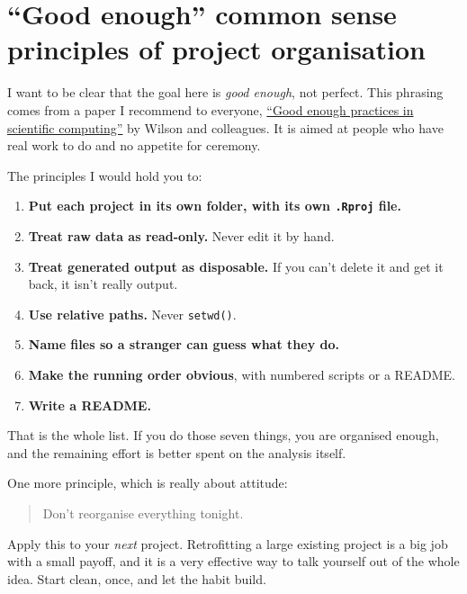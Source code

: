 \documentclass[
  letterpaper,
  justified,
  a4paper]{tufte-book}
\providecommand{\tightlist}{%
  \setlength{\itemsep}{0pt}\setlength{\parskip}{0pt}}
\providecommand{\tightlist}{%
  \setlength{\itemsep}{0pt}\setlength{\parskip}{0pt}}
\begin{document}
\section{``Good enough'' common sense principles of project
organisation}\label{good-enough-common-sense-principles-of-project-organisation}

I want to be clear that the goal here is \emph{good enough}, not
perfect. This phrasing comes from a paper I recommend to everyone,
\href{https://journals.plos.org/ploscompbiol/article?id=10.1371/journal.pcbi.1005510}{``Good
enough practices in scientific computing''} by Wilson and colleagues. It
is aimed at people who have real work to do and no appetite for
ceremony.

The principles I would hold you to:

\begin{enumerate}
\def\labelenumi{\arabic{enumi}.}
\tightlist
\item
  \textbf{Put each project in its own folder, with its own
  \texttt{.Rproj} file.}
\item
  \textbf{Treat raw data as read-only.} Never edit it by hand.
\item
  \textbf{Treat generated output as disposable.} If you can't delete it
  and get it back, it isn't really output.
\item
  \textbf{Use relative paths.} Never \texttt{setwd()}.
\item
  \textbf{Name files so a stranger can guess what they do.}
\item
  \textbf{Make the running order obvious}, with numbered scripts or a
  README.
\item
  \textbf{Write a README.}
\end{enumerate}

That is the whole list. If you do those seven things, you are organised
enough, and the remaining effort is better spent on the analysis itself.

One more principle, which is really about attitude:

\begin{quote}
Don't reorganise everything tonight.
\end{quote}

Apply this to your \emph{next} project. Retrofitting a large existing
project is a big job with a small payoff, and it is a very effective way
to talk yourself out of the whole idea. Start clean, once, and let the
habit build.
\end{document}
